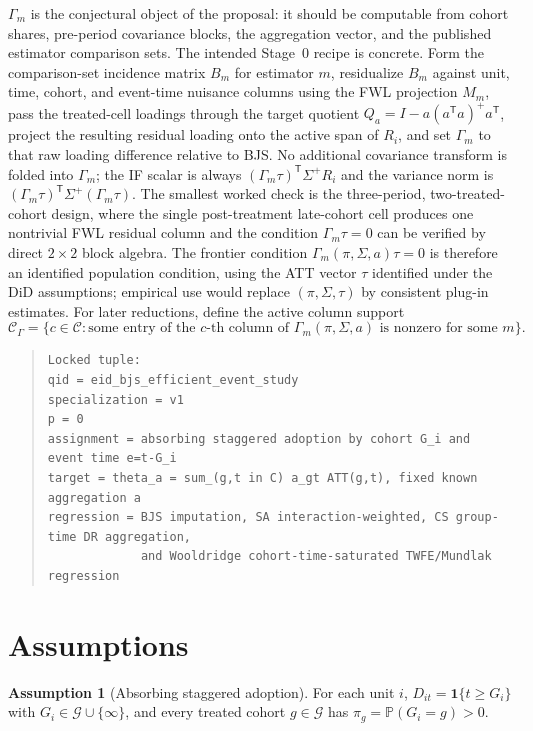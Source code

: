 \documentclass[11pt]{article}
\renewcommand{\Pr}{\mathbb{P}}
\newcommand{\one}{\mathbf{1}}
\newcommand{\transpose}{\mathsf{T}}
\theoremstyle{definition}
\newtheorem{assumption}{Assumption}
\theoremstyle{plain}
\theoremstyle{remark}
\begin{document}
\(\Gamma_m\) is the conjectural object of the proposal: it should be computable from cohort shares,
pre-period covariance blocks, the aggregation vector, and the published estimator comparison sets.
The intended Stage~0 recipe is concrete.  Form the comparison-set incidence matrix \(B_m\) for
estimator \(m\), residualize \(B_m\) against unit, time, cohort, and event-time nuisance columns using
the FWL projection \(M_m\), pass the treated-cell loadings through the target quotient
\(Q_a=I-a(a^\transpose a)^{+}a^\transpose\), project the resulting residual loading onto the active
span of \(R_i\), and set \(\Gamma_m\) to that raw loading difference relative to BJS.  No additional
covariance transform is folded into \(\Gamma_m\); the IF scalar is always
\((\Gamma_m\tau)^\transpose\Sigma^{+}R_i\) and the variance norm is
\((\Gamma_m\tau)^\transpose\Sigma^{+}(\Gamma_m\tau)\).
The smallest worked check is the three-period, two-treated-cohort design, where the single
post-treatment late-cohort cell produces one nontrivial FWL residual column and the condition
\(\Gamma_m\tau=0\) can be verified by direct \(2\times 2\) block algebra.
The frontier condition \(\Gamma_m(\pi,\Sigma,a)\tau=0\) is therefore an identified population
condition, using the ATT vector \(\tau\) identified under the DiD assumptions; empirical use would
replace \((\pi,\Sigma,\tau)\) by consistent plug-in estimates.  For later reductions,
define the active column support
\[
  \mathcal C_\Gamma=\{c\in\mathcal C:\text{some entry of the \(c\)-th column of }
  \Gamma_m(\pi,\Sigma,a)\text{ is nonzero for some }m\}.
\]

\begin{quote}
\begin{verbatim}
Locked tuple:
qid = eid_bjs_efficient_event_study
specialization = v1
p = 0
assignment = absorbing staggered adoption by cohort G_i and event time e=t-G_i
target = theta_a = sum_(g,t in C) a_gt ATT(g,t), fixed known aggregation a
regression = BJS imputation, SA interaction-weighted, CS group-time DR aggregation,
             and Wooldridge cohort-time-saturated TWFE/Mundlak regression
\end{verbatim}
\end{quote}

\section{Assumptions}
\begin{assumption}[Absorbing staggered adoption]\label{ass:absorbing}
For each unit \(i\), \(D_{it}=\one\{t\ge G_i\}\) with \(G_i\in\mathcal G\cup\{\infty\}\), and every
treated cohort \(g\in\mathcal G\) has \(\pi_g=\Pr(G_i=g)>0\).
\end{assumption}
\end{document}
